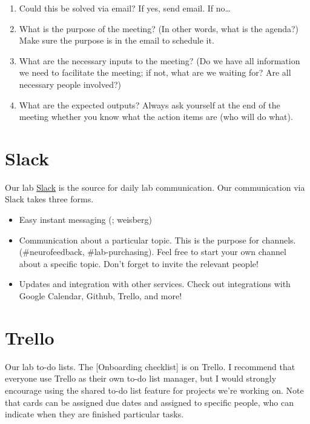 \documentclass[
  12pt,
]{book}
\begin{document}
\begin{enumerate}
\def\labelenumi{\arabic{enumi}.}
\item
  Could this be solved via email?
  If yes, send email. If no\ldots{}
\item
  What is the purpose of the meeting? (In other words, what is the agenda?) Make sure the purpose is in the email to schedule it.
\item
  What are the necessary inputs to the meeting? (Do we have all information we need to facilitate the meeting; if not, what are we waiting for? Are all necessary people involved?)
\item
  What are the expected outputs? Always ask yourself at the end of the meeting whether you know what the action items are (who will do what).
\end{enumerate}

\hypertarget{slack}{%
\section{Slack}\label{slack}}

Our lab \href{scannlab.slack.com}{Slack} is the source for daily lab communication. Our communication via Slack takes three forms.

\begin{itemize}
\item
  Easy instant messaging (\citet{everyone}; \citet{steve} weisberg)
\item
  Communication about a particular topic. This is the purpose for channels. (\#neurofeedback, \#lab-purchasing). Feel free to start your own channel about a specific topic. Don't forget to invite the relevant people!
\item
  Updates and integration with other services. Check out integrations with Google Calendar, Github, Trello, and more!
\end{itemize}

\hypertarget{trello}{%
\section{Trello}\label{trello}}

Our lab to-do lists. The {[}Onboarding checklist{]} is on Trello. I recommend that everyone use Trello as their own to-do list manager, but I would strongly encourage using the shared to-do list feature for projects we're working on. Note that cards can be assigned due dates and assigned to specific people, who can indicate when they are finished particular tasks.
\end{document}
